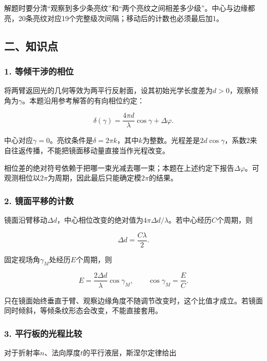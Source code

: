 \documentclass[12pt,a4paper,fontset=fandol]{ctexart}
\begin{document}
解题时要分清``观察到多少条亮纹''和``两个亮纹之间相差多少级''。中心与边缘都亮，20条亮纹对应19个完整级次间隔；移动后的计数也必须最后加1。

\subsection{二、知识点}\label{ux4e8cux77e5ux8bc6ux70b9}

\subsubsection{1.
等倾干涉的相位}\label{ux7b49ux503eux5e72ux6d89ux7684ux76f8ux4f4d}

将两臂返回光的几何等效为两平行反射面，设其初始光学长度差为\(d>0\)，观察倾角为\(\gamma\)。本题沿用参考解答的有向相位约定：

\[
\delta(\gamma)=\frac{4\pi d}{\lambda}\cos\gamma+\Delta\varphi.
\]

中心对应\(\gamma=0\)。亮纹条件是\(\delta=2\pi k\)，其中\(k\)为整数。光程差是\(2d\cos\gamma\)，系数2来自往返传播，不能把镜面移动量直接当作光程改变。

相位差的绝对符号依赖于把哪一束光减去哪一束；本题在上述约定下报告\(\Delta\varphi\)。可观测相位以\(2\pi\)为周期，因此最后只能确定模\(2\pi\)的结果。

\subsubsection{2.
镜面平移的计数}\label{ux955cux9762ux5e73ux79fbux7684ux8ba1ux6570}

镜面沿臂移动\(\Delta d\)，中心相位改变的绝对值为\(4\pi\Delta d/\lambda\)。若中心经历\(C\)个周期，则

\[
\Delta d=\frac{C\lambda}{2}.
\]

固定视场角\(\gamma_M\)处经历\(E\)个周期，则

\[
E=\frac{2\Delta d}{\lambda}\cos\gamma_M,
\qquad \cos\gamma_M=\frac EC.
\]

只在镜面始终垂直于臂、观察边缘角度不随调节改变时，这个比值才成立。若镜面同时倾斜，等倾条纹形态会改变，不能直接套用。

\subsubsection{3.
平行板的光程比较}\label{ux5e73ux884cux677fux7684ux5149ux7a0bux6bd4ux8f83}

对于折射率\(n\)、法向厚度\(t\)的平行液层，斯涅尔定律给出
\end{document}
